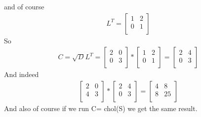 \documentclass[a4paper,11pt]{article}
\newcommand{\?}{\stackrel{?}{=}}
\begin{document}
and of course 
\begin{align*} 
L^T = 
\begin{bmatrix}
1 & 2 \\
0 & 1 \\
\end{bmatrix}
\end{align*}
So 
\begin{align*} 
C = \sqrt{D}L^T =
\begin{bmatrix}
2 & 0 \\
0 & 3 \\
\end{bmatrix}
*
\begin{bmatrix}
1 & 2 \\
0 & 1 \\
\end{bmatrix}
=
\begin{bmatrix}
2 & 4 \\
0 & 3 \\
\end{bmatrix}
\end{align*}
And indeed 
\begin{align*} 
\begin{bmatrix}
2 & 0 \\
4 & 3 \\
\end{bmatrix}
*
\begin{bmatrix}
2 & 4 \\
0 & 3 \\
\end{bmatrix}
=
\begin{bmatrix}
4 & 8 \\
8 & 25 \\
\end{bmatrix}
\end{align*}
And also of course if we run C= chol(S) we get the same result.
\end{document}
